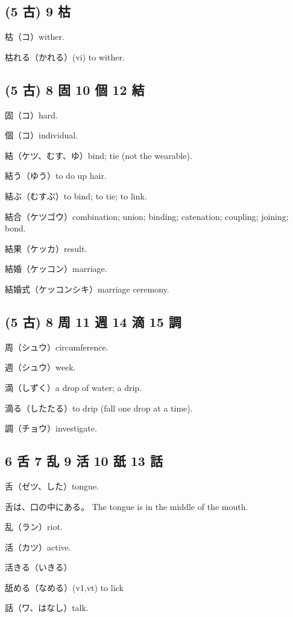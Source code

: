 \subsection{(5 古) 9 枯}

枯（コ）wither.

枯れる（かれる）(vi) to wither.

\subsection{(5 古) 8 固 10 個 12 結}

固（コ）hard.

個（コ）individual.

結（ケツ、むす、ゆ）bind; tie (not the wearable).

結う（ゆう）to do up hair.

結ぶ（むすぶ）to bind; to tie; to link.

結合（ケツゴウ）combination; union; binding; catenation; coupling; joining; bond.

結果（ケッカ）result.

結婚（ケッコン）marriage.

結婚式（ケッコンシキ）marriage ceremony.

\subsection{(5 古) 8 周 11 週 14 滴 15 調}

周（シュウ）circumference.

週（シュウ）week.

滴（しずく）a drop of water; a drip.

滴る（したたる）to drip (fall one drop at a time).

調（チョウ）investigate.

\subsection{6 舌 7 乱 9 活 10 舐 13 話}

舌（ゼツ、した）tongue.

舌は、口の中にある。
The tongue is in the middle of the mouth.

乱（ラン）riot.

活（カツ）active.

活きる（いきる）

舐める（なめる）(v1,vt) to lick

話（ワ、はなし）talk.

